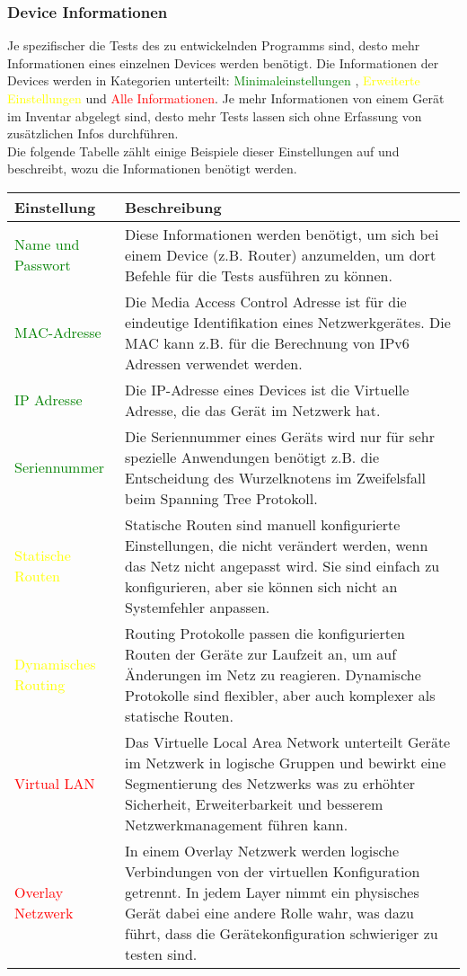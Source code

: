 \documentclass[
	ngerman,
	toc=listof, %
	toc=bibliography, %
	footnotes=multiple, %
	parskip=half, %
	numbers=noendperiod %
]{scrartcl}
\begin{document}
		\subsubsection{Device Informationen}
			Je spezifischer die Tests des zu entwickelnden Programms sind, desto mehr Informationen eines einzelnen Devices werden benötigt.
			Die Informationen der Devices werden in Kategorien unterteilt: \textcolor{green}{Minimaleinstellungen} , \textcolor{yellow}{Erweiterte Einstellungen} und \textcolor{red}{Alle Informationen}.
			Je mehr Informationen von einem Gerät im Inventar abgelegt sind, desto mehr Tests lassen sich ohne Erfassung von zusätzlichen Infos durchführen. \\
			Die folgende Tabelle zählt einige Beispiele dieser Einstellungen auf und beschreibt, wozu die Informationen benötigt werden.

			\begin{tabularx}{\textwidth}{lX}
				\toprule
				Einstellung & Beschreibung\\
				\midrule
				\textcolor{green}{Name und Passwort} & Diese Informationen werden benötigt, um sich bei einem Device (z.B. Router) anzumelden, um dort Befehle für die Tests ausführen zu können. \\	
				\textcolor{green}{MAC-Adresse} & Die Media Access Control Adresse ist für die eindeutige Identifikation eines Netzwerkgerätes. Die MAC kann z.B. für die Berechnung von IPv6 Adressen verwendet werden.\\
				\textcolor{green}{IP Adresse} & Die IP-Adresse eines Devices ist die Virtuelle Adresse, die das Gerät im Netzwerk hat. \\
				\textcolor{green}{Seriennummer} & Die Seriennummer eines Geräts wird nur für sehr spezielle Anwendungen benötigt z.B. die Entscheidung des Wurzelknotens im Zweifelsfall beim Spanning Tree Protokoll. \\
				\midrule
				\textcolor{yellow}{Statische Routen} & Statische Routen sind manuell konfigurierte Einstellungen, die nicht verändert werden, wenn das Netz nicht angepasst wird. Sie sind einfach zu konfigurieren, aber sie können sich nicht an Systemfehler anpassen. \\
				\textcolor{yellow}{Dynamisches Routing} & Routing Protokolle passen die konfigurierten Routen der Geräte zur Laufzeit an, um auf Änderungen im Netz zu reagieren. Dynamische Protokolle sind flexibler, aber auch komplexer als statische Routen. \\
				\midrule
				\textcolor{red}{Virtual LAN} & Das Virtuelle Local Area Network unterteilt Geräte im Netzwerk in logische Gruppen und bewirkt eine Segmentierung des Netzwerks was zu erhöhter Sicherheit, Erweiterbarkeit und besserem Netzwerkmanagement führen kann. \\
				\textcolor{red}{Overlay Netzwerk} & In einem Overlay Netzwerk werden logische Verbindungen von der virtuellen Konfiguration getrennt. In jedem Layer nimmt ein physisches Gerät dabei eine andere Rolle wahr, was dazu führt, dass die Gerätekonfiguration schwieriger zu testen sind. \\				
				\bottomrule
			\end{tabularx}
			\newpage
\end{document}
